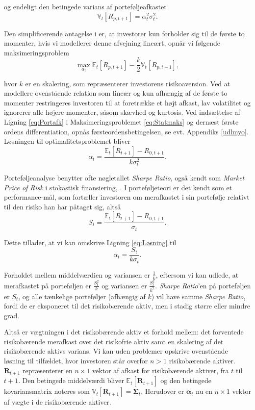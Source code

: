 \documentclass[
  a4paper,
  oneside]{memoir}
\begin{document}
og endeligt den betingede varians af porteføljeafkastet
\begin{equation}
\mathbb{V}_t\left[R_{p,t+1}\right]=\alpha_t^2\sigma_t^2.\label{eq:Varport}
\end{equation}

Den simplificerende antagelse i \citep{Markowitz1952} er, at investorer kun forholder sig til de første to momenter, hvis vi modellerer denne afvejning lineært, opnår vi følgende maksimeringsproblem
\begin{equation}
\max_{\alpha_t} \mathbb{E}_t\left[R_{p,t+1}\right] -\frac{k}{2} \mathbb{V}_t\left[R_{p,t+1}\right],\label{eq:Statmaks}
\end{equation}

hvor \(k\) er en skalering, som repræsenterer investorens risikoaversion. Ved at modellere ovenstående relation som lineær og kun afhængig af de første to momenter restringeres investoren til at foretrække et højt afkast, lav volatilitet og ignorerer alle højere momenter, såsom skævhed og kurtosis. Ved indsættelse af Ligning \eqref{eq:Portafk} i Maksimeringsproblemet \eqref{eq:Statmaks} og dernæst første ordens differentiation, opnås førsteordensbetingelsen, se evt. Appendiks \ref{udlmyo}. Løsningen til optimalitetsproblemet bliver
\begin{equation}
\alpha_t = \frac{\mathbb{E}_t\left[R_{t+1}\right]-R_{0,t+1}}{k\sigma_t^2}.\label{eq:Løsning}
\end{equation}

Porteføljeanalyse benytter ofte nøgletallet \emph{Sharpe Ratio}, også kendt som \emph{Market Price of Risk} i stokastisk finansiering, \citep{Bjork2009}. I porteføljeteori er det kendt som et performance-mål, som fortæller investoren om merafkastet i sin portefølje relativt til den risiko han har påtaget sig, altså
\[S_t=\frac{\mathbb{E}_t\left[R_{t+1}\right]-R_{0,t+1}}{\sigma_t}.\]

Dette tillader, at vi kan omskrive Ligning \eqref{eq:Løsning} til
\[\alpha_t=\frac{S_t}{k\sigma_t}.\]

Forholdet mellem middelværdien og variansen er \(\tfrac{1}{k}\), eftersom vi kan udlede, at merafkastet på porteføljen er \(\tfrac{S_t^2}{k}\) og variansen er \(\tfrac{S_t^2}{k^2}\). \emph{Sharpe Ratio}'en på porteføljen er \(S_t\), og alle tænkelige porteføljer (afhængig af \(k\)) vil have samme \emph{Sharpe Ratio}, fordi de er eksponeret til det risikobærende aktiv, men i stadig større eller mindre grad.

Altså er vægtningen i det risikobærende aktiv et forhold mellem: det forventede risikobærende merafkast over det risikofrie aktiv samt en skalering af det risikobærende aktivs varians. Vi kan uden problemer opskrive ovenstående løsning til tilfældet, hvor investoren står overfor \(n>1\) risikobærende aktiver. \(\bm{R}_{t+1}\) repræsenterer en \(n\times 1\) vektor af afkast for risikobærende aktiver, fra \(t\) til \(t+1\). Den betingede middelværdi bliver \(\mathbb{E}_t\left[\bm{R}_{t+1}\right]\) og den betingede kovariansmatrix noteres som \(\mathbb{V}_t\left[\bm{R}_{t+1}\right]=\bm{\Sigma}_t\). Herudover er \(\bm{\alpha}_t\) nu en \(n\times 1\) vektor af vægte i de risikobærende aktiver.
\end{document}
